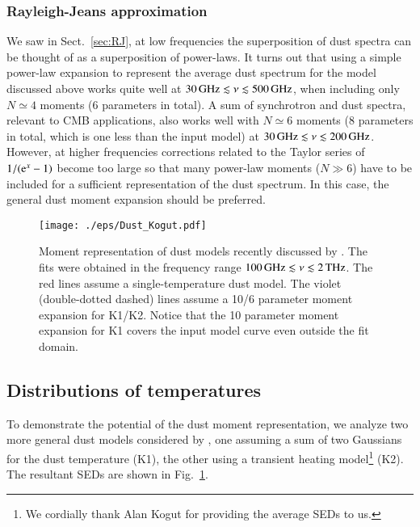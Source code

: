\documentclass[usenatbib]{mn2e}
\begin{document}
\vspace{-0mm}
\subsubsection{Rayleigh-Jeans approximation}
\label{sec:RJ_test}
%
We saw in Sect.~\ref{sec:RJ}, at low frequencies the superposition of dust spectra can be thought of as a superposition of power-laws. 
% 
It turns out that using a simple power-law expansion to represent the average dust spectrum for the model discussed above works quite well at $30\,{\rm GHz}\lesssim \nu\lesssim 500\,{\rm GHz}$, when including only $N\simeq 4$ moments (6 parameters in total). A sum of synchrotron and dust spectra, relevant to CMB applications, also works well with $N\simeq 6$ moments (8 parameters in total, which is one less than the input model) at $30\,{\rm GHz}\lesssim\nu\lesssim 200\,{\rm GHz}$. However, at higher frequencies corrections related to the Taylor series of $1/({{\rm e}^{x}}-1)$ become too large so that many power-law moments ($N\gg 6$) have to be included for a sufficient representation of the dust spectrum. In this case, the general dust moment expansion should be preferred. 
  
 


\begin{figure}
\centering 
\texttt{[image: ./eps/Dust\_Kogut.pdf]}
%
\caption{Moment representation of dust models recently discussed by \citet{Kogut2016}. The fits were obtained in the frequency range $100\,{\rm GHz}\lesssim \nu\lesssim 2\,{\rm THz}$. The red lines assume a single-temperature dust model. The violet (double-dotted dashed) lines assume a 10/6 parameter moment expansion for K1/K2. Notice that the 10 parameter moment expansion for K1 covers the input model curve even outside the fit domain.}
\label{fig:mBB_dist}
\end{figure}
\subsection{Distributions of temperatures}
\label{sec:T_distributions}
%
To demonstrate the potential of the dust moment representation, we analyze two more general dust models considered by \citet{Kogut2016}, one assuming a sum of two Gaussians for the dust temperature (K1), the other using a transient heating model\footnote{We cordially thank Alan Kogut for providing the average SEDs to us.}  (K2). The resultant SEDs are shown in Fig.~\ref{fig:mBB_dist}. 
\end{document}
